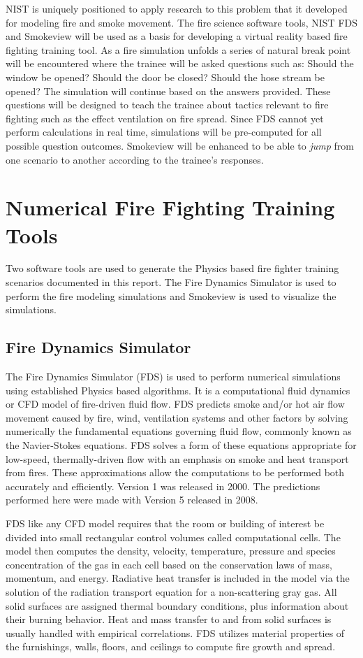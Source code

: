 \documentclass[11pt]{book}
\begin{document}
NIST is uniquely positioned to apply research to this problem that it developed for modeling fire and smoke movement.  The fire science software tools, NIST FDS and Smokeview will be used as a basis for developing a virtual reality based fire fighting training tool.  As a fire simulation unfolds a series of natural break point will be encountered where the trainee will be asked questions such as: Should the window be opened?  Should the door be closed? Should the hose stream be opened?  The simulation will continue based on the answers provided.  These questions will be designed to teach the trainee about tactics relevant to fire fighting such as the effect ventilation on fire spread.    Since FDS cannot yet perform calculations in real time, simulations will be pre-computed for all possible question outcomes.  Smokeview will be enhanced to be able to {\em jump}
from one scenario to another according to the trainee's responses.

\section{Numerical Fire Fighting Training Tools}
Two software tools are used to generate the Physics based fire fighter training scenarios documented in this report.  The Fire Dynamics Simulator is used to perform the fire modeling simulations and Smokeview is used to visualize the simulations.

\subsection{Fire Dynamics Simulator}
The Fire Dynamics Simulator (FDS) is used to perform numerical simulations using established Physics based algorithms. It is a computational fluid dynamics or CFD model of fire-driven fluid flow. FDS predicts smoke and/or hot air flow movement caused by fire, wind, ventilation systems and other factors by solving numerically the fundamental equations governing fluid flow, commonly known as the Navier-Stokes equations. FDS solves a form of these equations appropriate for low-speed, thermally-driven flow with an emphasis on smoke and heat transport from fires. These approximations allow the computations to be performed both accurately and efficiently. Version 1 was released in 2000. The predictions performed here were made with Version 5 released in 2008.

FDS like any CFD model requires that the room or building of interest be divided into small rectangular control volumes called computational cells. The model then computes the density, velocity, temperature, pressure and species concentration of the gas in each cell based on the conservation laws of mass, momentum, and energy.  Radiative heat transfer is included in the model via the solution of the radiation transport equation for a non-scattering gray gas. All solid surfaces are assigned thermal boundary conditions, plus information about their burning behavior. Heat and mass transfer to and from solid surfaces is usually handled with empirical correlations. FDS utilizes material properties of the furnishings, walls, floors, and ceilings to compute fire growth and spread.
\end{document}
